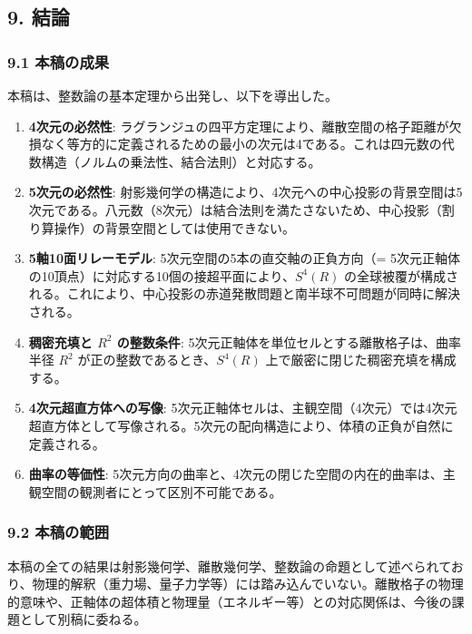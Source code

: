 \documentclass[a4paper,11pt]{ltjsarticle}
\begin{document}
\subsection{9. 結論}\label{ux7d50ux8ad6}

\subsubsection{9.1 本稿の成果}\label{ux672cux7a3fux306eux6210ux679c}

本稿は、整数論の基本定理から出発し、以下を導出した。

\begin{enumerate}
\def\labelenumi{\arabic{enumi}.}
\item
  \textbf{4次元の必然性}:
  ラグランジュの四平方定理により、離散空間の格子距離が欠損なく等方的に定義されるための最小の次元は4である。これは四元数の代数構造（ノルムの乗法性、結合法則）と対応する。
\item
  \textbf{5次元の必然性}:
  射影幾何学の構造により、4次元への中心投影の背景空間は5次元である。八元数（8次元）は結合法則を満たさないため、中心投影（割り算操作）の背景空間としては使用できない。
\item
  \textbf{5軸10面リレーモデル}: 5次元空間の5本の直交軸の正負方向（=
  5次元正軸体の10頂点）に対応する10個の接超平面により、\(S^4(R)\)
  の全球被覆が構成される。これにより、中心投影の赤道発散問題と南半球不可問題が同時に解決される。
\item
  \textbf{稠密充填と \(R^2\) の整数条件}:
  5次元正軸体を単位セルとする離散格子は、曲率半径 \(R^2\)
  が正の整数であるとき、\(S^4(R)\) 上で厳密に閉じた稠密充填を構成する。
\item
  \textbf{4次元超直方体への写像}:
  5次元正軸体セルは、主観空間（4次元）では4次元超直方体として写像される。5次元の配向構造により、体積の正負が自然に定義される。
\item
  \textbf{曲率の等価性}:
  5次元方向の曲率と、4次元の閉じた空間の内在的曲率は、主観空間の観測者にとって区別不可能である。
\end{enumerate}

\subsubsection{9.2 本稿の範囲}\label{ux672cux7a3fux306eux7bc4ux56f2}

本稿の全ての結果は射影幾何学、離散幾何学、整数論の命題として述べられており、物理的解釈（重力場、量子力学等）には踏み込んでいない。離散格子の物理的意味や、正軸体の超体積と物理量（エネルギー等）との対応関係は、今後の課題として別稿に委ねる。
\end{document}
